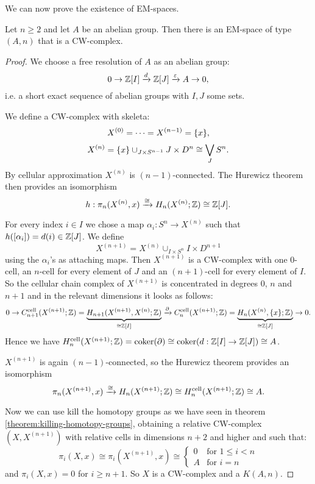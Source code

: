 

We can now prove the existence of EM-spaces.

\begin{theorem}
Let $n\geq2$ and let $A$ be an abelian group. Then there is an EM-space of type $(A,n)$ that is a CW-complex.
\end{theorem}

\begin{proof}
We choose a free resolution of $A$ as an abelian group:
\[0\to{\mathbb Z}[I]\xrightarrow{d}{\mathbb Z}[J]\xrightarrow{\varepsilon}A\to0,\]
i.e. a short exact sequence of abelian groups with $I,J$ some sets.

We define a CW-complex with skeleta:
\[X^{(0)}=\cdots=X^{({n-1})}=\{x\},\]
\[X^{(n)}=\{x\}\cup_{J\times S^{n-1}}J\times D^n\cong\bigvee_J S^n.\]
By cellular approximation $X^{(n)}$ is $(n-1)$-connected. The Hurewicz theorem then provides an isomorphism
\[h:\pi_n(X^{(n)},x)\xrightarrow{\cong}H_n(X^{(n)};{\mathbb Z})\cong{\mathbb Z}[J].\]

For every index $i\in I$ we chose a map $\alpha_i:S^n\to X^{(n)}$ such that $h([\alpha_i])=d(i)\in{\mathbb Z}[J]$. We define
\[X^{(n+1)}=X^{(n)}\cup_{I\times S^n}I\times D^{n+1}\]
using the $\alpha_i$'s as attaching maps. Then $X^{(n+1)}$ is a CW-complex with one $0$-cell, an $n$-cell for every element of $J$ and an $(n+1)$-cell for every element of $I$. So the cellular chain complex of $X^{(n+1)}$ is concentrated in degrees $0$, $n$ and $n+1$ and in the relevant dimensions it looks as follows:
{\small
\[0\to C^\text{cell}_{n+1}(X^{(n+1)};{\mathbb Z})=\underbrace{H_{n+1}(X^{(n+1)},X^{(n)};{\mathbb Z})}_{\cong{\mathbb Z}[I]}\xrightarrow{\partial}C^\text{cell}_n(X^{(n+1)};{\mathbb Z})=\underbrace{H_n(X^{(n)},\{x\};{\mathbb Z})}_{\cong{\mathbb Z}[J]}\to0.\]}Hence we have $H_n^\text{cell}(X^{(n+1)};{\mathbb Z})=\operatorname{coker}(\partial)\cong\operatorname{coker}(d:{\mathbb Z}[I]\to{\mathbb Z}[J])\cong A$.

$X^{(n+1)}$ is again $(n-1)$-connected, so the Hurewicz theorem provides an isomorphism
\[\pi_n(X^{(n+1)},x)\xrightarrow{\cong}H_n(X^{(n+1)};{\mathbb Z})\cong H^\text{cell}_n(X^{(n+1)};{\mathbb Z})\cong A.\]

Now we can use kill the homotopy groups as we have seen in theorem \ref{theorem:killing-homotopy-groups}, obtaining a relative CW-complex $(X,X^{(n+1)})$ with relative cells in dimensions $n+2$ and higher and such that:
\[\pi_i(X,x)\cong\pi_i(X^{(n+1)},x)\cong\begin{cases}
0 & \text{for } 1\le i < n\\
A & \text{for } i = n
\end{cases}\]
and $\pi_i(X,x)=0$ for $i\ge n+1$. So $X$ is a CW-complex and a $K(A,n)$.
\end{proof}

